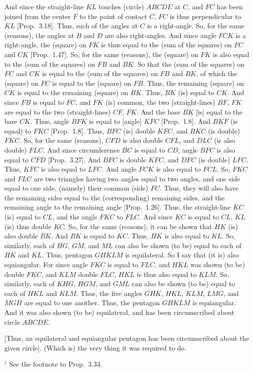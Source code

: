 \begin{Parallel}{}{}
{And since the straight-line $KL$ touches (circle) $ABCDE$ at $C$, and $FC$ has been
joined from the center $F$ to the point of contact $C$, $FC$ is thus perpendicular 
to $KL$ [Prop.~3.18]. Thus, each of the angles
at $C$ is a right-angle. So, for the same (reasons), the angles at $B$ and $D$
are also right-angles. And since angle $FCK$ is a right-angle, the (square)
on $FK$ is thus equal to the (sum of the squares) on $FC$ and $CK$ [Prop.~1.47]. So, for the same (reasons), 
the (square) on $FK$ is also equal to the (sum of the squares) on $FB$ and $BK$.
So that the (sum of the squares) on $FC$ and $CK$ is equal to the (sum of the squares) on $FB$ and $BK$, of which the (square) on $FC$ is equal to the
(square) on $FB$. Thus, the remaining (square) on $CK$ is equal to
the remaining (square) on $BK$. Thus, $BK$ (is) equal to $CK$. And since
$FB$ is equal to $FC$, and $FK$ (is) common, the two (straight-lines)
$BF$, $FK$ are equal to the two (straight-lines) $CF$, $FK$. And the base $BK$
[is] equal to the base $CK$. Thus, angle $BFK$ is equal to [angle] $KFC$ 
[Prop.~1.8]. And $BKF$ (is equal) to $FKC$ [Prop.~1.8].
Thus, $BFC$ (is) double $KFC$,
and $BKC$ (is double) $FKC$. So, for the same (reasons), $CFD$ is also double
$CFL$, and $DLC$ (is also double) $FLC$. And since circumference $BC$
is equal  to $CD$, angle $BFC$ is also  equal  to $CFD$ [Prop.~3.27]. And $BFC$ is double $KFC$,
and $DFC$ (is double) $LFC$.  Thus, $KFC$ is also equal to $LFC$. 
And
angle $FCK$ is also equal to $FCL$. So, $FKC$ and $FLC$ are two triangles
having two angles equal to two angles, and one side equal to one side,
(namely) their common (side) $FC$. Thus, they will also have the
remaining sides equal to the (corresponding) remaining sides, and
the remaining angle to the remaining angle [Prop.~1.26]. Thus, the straight-line $KC$
(is) equal to $CL$, and the angle $FKC$ to $FLC$. And since $KC$ is
equal to $CL$, $KL$ (is) thus double $KC$. So, for the
same (reasons), it can be shown that $HK$ (is) also double $BK$. And
$BK$ is equal to $KC$. Thus, $HK$ is also equal to $KL$. So, similarly,  each of $HG$, $GM$, and $ML$ can also be shown (to be) equal to each of
$HK$ and $KL$. Thus, pentagon $GHKLM$ is equilateral. So I say that
(it is) also equiangular. For since angle $FKC$ is equal to $FLC$, 
and $HKL$ was shown (to be) double $FKC$, and $KLM$ double 
$FLC$, $HKL$ is thus also equal to $KLM$. So, similarly, each of $KHG$, $HGM$, and $GML$ can also be shown (to be) equal to each of
$HKL$ and $KLM$. Thus, the five angles $GHK$, $HKL$, $KLM$, $LMG$, and
$MGH$ are equal to one another. Thus, the pentagon $GHKLM$ is
equiangular. And it was also shown (to be) equilateral, and has been circumscribed 
about circle $ABCDE$.

\mbox{[}Thus, an equilateral and equiangular pentagon has been circumscribed
about the given circle]. (Which is) the very thing it was required to do. }
\end{Parallel}
{\footnotesize \noindent$^\dag$ See the footnote to Prop.~3.34.} 

